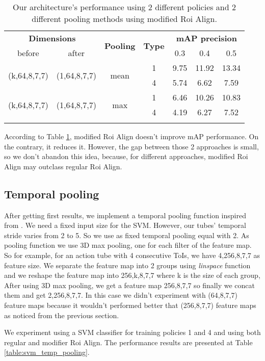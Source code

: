\begin{center}
\begin{longtable}{||c | c | c| c||c c c||}

  \hline
  \multicolumn{2}{||c|}{\textbf{Dimensions}} & \multirow{2}{*}{ \textbf{Pooling}} &\multirow{2}{*}{\textbf{Type}} & \multicolumn{3}{|c||}{\textbf{mAP precision}}\\

   before & after &  {} & {} &  0.3 &  0.4 & 0.5 \\
 \hline   \hline
 \multirow{2}{*}{(k,64,8,7,7)} & \multirow{2}{*}{(1,64,8,7,7)} & \multirow{2}{*}{mean}  & 1 & 9.75 & 11.92 & 13.34 \\
  \cline{4-7}
  {} & {} & {} & 4 &  5.74 &6.62 & 7.59 \\
  \hline
 \multirow{2}{*}{(k,64,8,7,7)} & \multirow{2}{*}{(1,64,8,7,7)} & \multirow{2}{*}{max}  & 1 &  6.46 & 10.26 & 10.83 \\
    \cline{4-7}
  {} & {} & {} & 4 & 4.19 & 6.27 & 7.52 \\
    \cline{4-7}
  \hline
  \caption{Our architecture's performance using 2 different policies and 2 different pooling methods using modified Roi Align.}
  \label{table:svm_mod_roialign}

\end{longtable} 
\end{center}

According to Table \ref{table:svm_mod_roialign}, modified Roi Align doesn't improve mAP performance. On the contrary, it reduces it.
However, the gap between those 2 approaches is small, so we don't abandon this idea, because, for different approaches,
modified Roi Align may outclass regular Roi Align.

\subsection{Temporal pooling}
After getting first results, we implement a temporal pooling function inspired from \cite{DBLP:journals/corr/HouCS17}. We need a
fixed input size for the SVM. However, our tubes' temporal stride varies from 2 to 5. So we use as fixed temporal pooling equal
with 2. As pooling function we use 3D max pooling, one for each filter of the feature map.  So for example, for an action tube
with 4 consecutive ToIs, we  have 4,256,8,7,7 as feature size. We separate the feature map into 2 groups using \textit{linspace}
function and we reshape the feature map into 256,k,8,7,7 where k is the size of each group, After using 3D max pooling, we get
a feature map 256,8,7,7 so finally we concat them and get 2,256,8,7,7. In this case we didn't experiment with (64,8,7,7) feature
maps because it wouldn't performed better that (256,8,7,7) feature maps as noticed from the previous section. \par
We experiment using a SVM classifier for training policies 1 and 4 and using both regular and modifier Roi Align. The
performance results are presented at Table \ref{table:svm_temp_pooling}.

